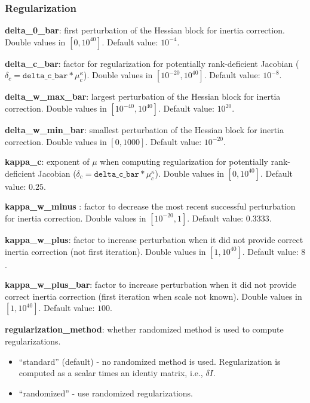 \subsubsection{Regularization}

\noindent \textbf{delta\_0\_bar}: first perturbation of the Hessian block for inertia correction. Double values in $[0,10^{40}]$. Default value: $10^{-4}$. 
\medskip

\noindent \textbf{delta\_c\_bar}: factor for regularization for potentially rank-deficient Jacobian ($\delta_c=\texttt{delta\_c\_bar}*\mu^\kappa_c$). Double values in $[10^{-20},10^{40}]$. Default value: $10^{-8}$. 
\medskip

\noindent \textbf{delta\_w\_max\_bar}: largest perturbation of the Hessian block for inertia correction. Double values in $[10^{-40},10^{40}]$. Default value: $10^{20}$. 
\medskip

\noindent \textbf{delta\_w\_min\_bar}: smallest perturbation of the Hessian block for inertia correction. Double values in $[0,1000]$. Default value: $10^{-20}$. 
\medskip

\noindent \textbf{kappa\_c}: exponent of $\mu$ when computing regularization for potentially rank-deficient Jacobian ($\delta_c=\texttt{delta\_c\_bar}*\mu^\kappa_c$). Double values in $[0,10^{40}]$. Default value: $0.25$. 
\medskip

\noindent \textbf{kappa\_w\_minus }: factor to decrease the most recent successful perturbation for inertia correction. Double values in $[10^{-20}, 1]$. Default value: $0.3333$.
\medskip

\noindent \textbf{kappa\_w\_plus}: factor to increase perturbation when it did not provide correct inertia correction (not first iteration). Double values in $[1, 10^{40}]$. Default value: $8$.
\medskip

\noindent \textbf{kappa\_w\_plus\_bar}: factor to increase perturbation when it did not provide correct inertia correction (first iteration when scale not known). Double values in $[1, 10^{40}]$. Default value: $100$.
\medskip

\noindent \textbf{regularization\_method}: whether randomized method is used to compute regularizations.
\begin{itemize}
\item ``standard'' (default) - no randomized method is used. Regularization is computed as a scalar times an identiy matrix, i.e., $\delta I$.
\item ``randomized'' - use randomized regularizations.
\end{itemize}
\medskip

